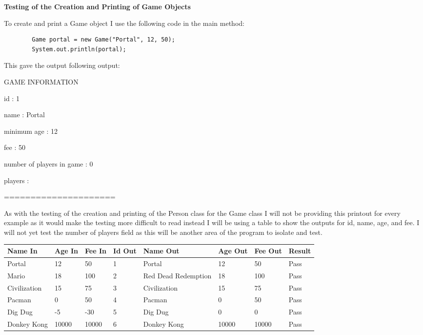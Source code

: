 \documentclass[a4paper]{article}
\begin{document}
\noindent \textbf{Testing of the Creation and Printing of Game Objects}

\noindent To create and print  a Game object I use the following code in the main method: 
\begin{lstlisting}
		Game portal = new Game("Portal", 12, 50);
		System.out.println(portal);
\end{lstlisting}

This gave the output following output: \newline

\noindent GAME INFORMATION

\noindent id : 1

\noindent name : Portal

\noindent minimum age : 12

\noindent fee : 50

\noindent number of players in game : 0

\noindent players : 

\noindent =====================

As with the testing of the creation and printing of the Person class for the Game class I will not be providing this printout for every example as it would make the testing more difficult to read instead I will be using a table to show the outputs for id, name, age, and fee. I will not yet test the number of players field as this will be another area of the program to isolate and test.

\begin{table}[H]
\begin{tabular}{|l|l|l|l|l|l|l|l|}
\hline
\textbf{Name In} & \textbf{Age In} & \textbf{Fee In} & \textbf{Id Out} & \textbf{Name Out}   & \textbf{Age Out} & \textbf{Fee Out} & \textbf{Result} \\ \hline
Portal           & 12              & 50              & 1               & Portal              & 12               & 50               & Pass            \\ \hline
Mario            & 18              & 100             & 2               & Red Dead Redemption & 18               & 100              & Pass            \\ \hline
Civilization     & 15              & 75              & 3               & Civilization        & 15               & 75               & Pass            \\ \hline
Pacman           & 0               & 50              & 4               & Pacman              & 0                & 50               & Pass            \\ \hline
Dig Dug          & -5              & -30             & 5               & Dig Dug             & 0                & 0                & Pass            \\ \hline
Donkey Kong      & 10000           & 10000           & 6               & Donkey Kong         & 10000            & 10000            & Pass            \\ \hline
\end{tabular}
\end{table}
\end{document}
